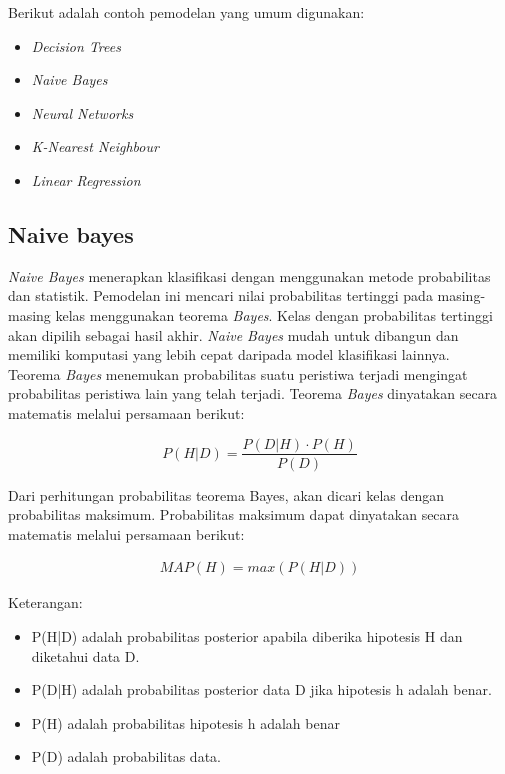 \noindent Berikut adalah contoh pemodelan yang umum digunakan:
\begin{itemize}
\item \textit{Decision Trees}
\item \textit{Naive Bayes}
\item \textit{Neural Networks}
\item \textit{K-Nearest Neighbour}
\item \textit{Linear Regression}
\end{itemize}

\subsection{Naive bayes}
\label{sec:naive_bayes}
\par \textit{Naive Bayes} menerapkan klasifikasi dengan menggunakan metode probabilitas dan statistik. Pemodelan ini mencari nilai probabilitas tertinggi pada masing-masing kelas menggunakan teorema \textit{Bayes}. Kelas dengan probabilitas tertinggi akan dipilih sebagai hasil akhir. \textit{Naive Bayes} mudah untuk dibangun dan memiliki komputasi yang lebih cepat daripada model klasifikasi lainnya.\\

\noindent Teorema \textit{Bayes} menemukan probabilitas suatu peristiwa terjadi mengingat probabilitas peristiwa lain yang telah terjadi. Teorema \textit{Bayes} dinyatakan secara matematis melalui persamaan berikut:

\begin{equation}
P(H|D) = \frac{P(D|H) \cdot P(H)}{P(D)}
\end{equation}

\noindent
Dari perhitungan probabilitas teorema Bayes, akan dicari kelas dengan probabilitas maksimum. Probabilitas maksimum dapat dinyatakan secara matematis melalui persamaan berikut:

\begin{align}
MAP(H) = max(P(H|D))
\end{align}

\noindent Keterangan:
\begin{itemize}
\item P(H|D) adalah probabilitas posterior apabila diberika hipotesis H dan diketahui data D. 
\item P(D|H) adalah probabilitas posterior data D jika hipotesis h adalah benar.
\item P(H) adalah probabilitas hipotesis h adalah benar 
\item P(D) adalah probabilitas data.
\end{itemize}

